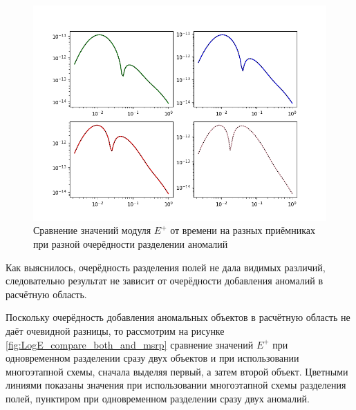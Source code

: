 \begin{figure}
	\centering
	\vspace*{0.7cm}
	\includegraphics[width=1.0\linewidth]{images/Log_E_compare_1_and_2.png}
	\caption{Сравнение значений модуля $E^+$ от времени на разных приёмниках при разной очерёдности разделении аномалий}
	\label{fig:LogE_compare_1_and_2}
\end{figure} 


Как выяснилось, очерёдность разделения полей не дала видимых различий, следовательно результат не зависит от очерёдности добавления аномалий в расчётную область.

Поскольку очерёдность добавления аномальных объектов в расчётную область не даёт очевидной разницы, то рассмотрим на рисунке \ref{fig:LogE_compare_both_and_msrp} сравнение значений $E^+$ при одновременном разделении сразу двух объектов и при использовании многоэтапной схемы, сначала выделяя первый, а затем второй объект. Цветными линиями показаны значения при использовании многоэтапной схемы разделения полей, пунктиром при одновременном разделении сразу двух аномалий.

